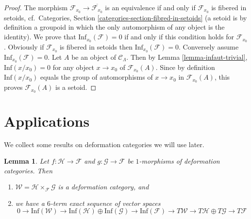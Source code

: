 \documentclass{stacks-project}
\theoremstyle{plain}
\newtheorem{lemma}[subsection]{Lemma}
\theoremstyle{definition}
\theoremstyle{remark}
\numberwithin{equation}{subsection}
\begin{document}
\begin{proof}
The morphism $\mathcal{F}_{x_0} \to \overline{\mathcal{F}_{x_0}}$ is an
equivalence if and only if $\mathcal{F}_{x_0}$ is fibered in setoids,
cf.\ Categories, Section \ref{categories-section-fibred-in-setoids}
(a setoid is by definition a groupoid in
which the only automorphism of any object is the identity). We prove that
$\text{Inf}_{x_0}(\mathcal{F}) = 0$ if and only if this condition holds
for $\mathcal{F}_{x_0}$.  Obviously if $\mathcal{F}_{x_0}$ is fibered in
setoids then $\text{Inf}_{x_0}(\mathcal{F}) = 0$.  Conversely assume
$\text{Inf}_{x_0}(\mathcal{F}) = 0$.  Let $A$ be an object of
$\mathcal{C}_\Lambda$. Then by
Lemma \ref{lemma-infaut-trivial},
$\text{Inf}(x/x_0) = 0$ for any object $x \to x_0$ of
$\mathcal{F}_{x_0}(A)$. Since by definition $\text{Inf}(x/x_0)$
equals the group of automorphisms of $x \to x_0$ in $\mathcal{F}_{x_0}(A)$,
this proves $\mathcal{F}_{x_0}(A)$ is a setoid.
\end{proof}








\section{Applications}
\label{section-applications}

\noindent
We collect some results on deformation categories we will use later.

\begin{lemma}
\label{lemma-deformation-categories-fiber-product-morphisms}
Let $f : \mathcal{H} \to \mathcal{F}$ and $g : \mathcal{G} \to \mathcal{F}$
be $1$-morphisms of deformation categories. Then
\begin{enumerate}
\item $\mathcal{W} = \mathcal{H} \times_\mathcal{F} \mathcal{G}$ is a
deformation category, and
\item we have a $6$-term exact sequence of vector spaces
$$
0 \to \text{Inf}(\mathcal{W})
\to \text{Inf}(\mathcal{H}) \oplus \text{Inf}(\mathcal{G})
\to \text{Inf}(\mathcal{F}) \to
T\mathcal{W} \to T\mathcal{H} \oplus T\mathcal{G} \to T\mathcal{F}
$$
\end{enumerate}
\end{lemma}
\end{document}
